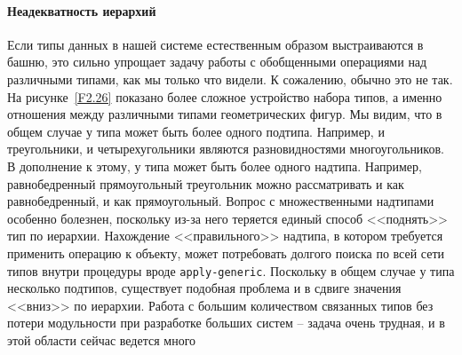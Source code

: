 \paragraph{Неадекватность иерархий}


Если типы данных в нашей системе естественным образом
выстраиваются в башню, это сильно упрощает задачу работы с обобщенными
операциями над различными типами, как мы только что видели.  К
сожалению, обычно это не так.  На рисунке~\ref{F2.26}
показано более сложное устройство набора типов, а именно отношения
между различными типами геометрических фигур.
Мы видим, что в общем случае у типа может быть более одного подтипа.  Например, и
треугольники, и четырехугольники являются разновидностями
многоугольников. В дополнение к этому, у типа может быть  
более одного
надтипа.  Например, равнобедренный прямоугольный треугольник можно
рассматривать и как равнобедренный, и как прямоугольный.  Вопрос с
множественными надтипами особенно болезнен, поскольку из-за него
теряется единый способ <<поднять>> тип по иерархии.  Нахождение
<<правильного>> надтипа, в котором требуется применить операцию к
объекту, может потребовать долгого поиска по всей сети типов внутри
процедуры вроде {\tt apply-generic}.  Поскольку в общем случае
у типа несколько подтипов, существует подобная проблема и в сдвиге
значения <<вниз>> по иерархии. Работа с большим количеством связанных
типов без потери модульности при разработке больших систем --
задача очень трудная, и в этой области сейчас ведется много
